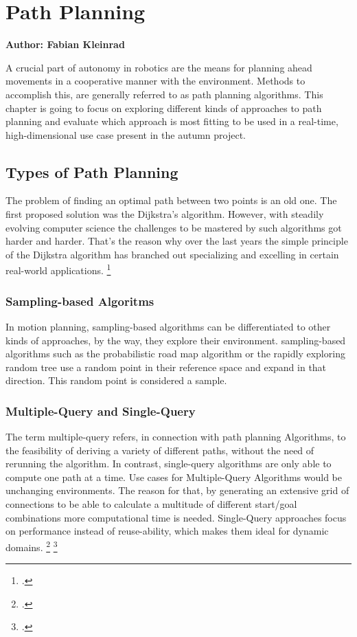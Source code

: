 \chapter{Path Planning}

\textbf{Author: Fabian Kleinrad} 

A crucial part of autonomy in robotics are the means for planning ahead movements in a cooperative manner with the environment. Methods to accomplish this, are generally referred to as path planning algorithms. This chapter is going to focus on exploring different kinds of approaches to path planning and evaluate which approach is most fitting to be used in a real-time, high-dimensional use case present in the autumn project.


\section{Types of Path Planning}

The problem of finding an optimal path between two points is an old one.
The first proposed solution was the Dijkstra's algorithm. However, with steadily evolving computer science the challenges to be mastered by such algorithms got harder and harder. That's the reason why over the last years the simple principle of the Dijkstra algorithm has branched out specializing and excelling in certain real-world applications.
\footcite{Pan2020}

\subsection{Sampling-based Algoritms}

In motion planning, sampling-based algorithms can be differentiated to other kinds of approaches, by the way, they explore their environment. sampling-based algorithms such as the probabilistic road map algorithm or the rapidly exploring random tree use a random point in their reference space and expand in that direction. This random point is considered a sample.

\subsection{Multiple-Query and Single-Query}

The term multiple-query refers, in connection with path planning Algorithms, to the feasibility of deriving a variety of different paths, without the need of rerunning the algorithm. In contrast, single-query algorithms are only able to compute one path at a time.\newline
Use cases for Multiple-Query Algorithms would be unchanging environments. The reason for that, by generating an extensive grid of connections to be able to calculate a multitude of different start/goal combinations  more computational time is needed.\newline
Single-Query approaches focus on performance instead of reuse-ability, which makes them ideal for dynamic domains. 
\footcite{Bekris2003}
\footcite{stackexchangeMultiSingleQuery2019}

